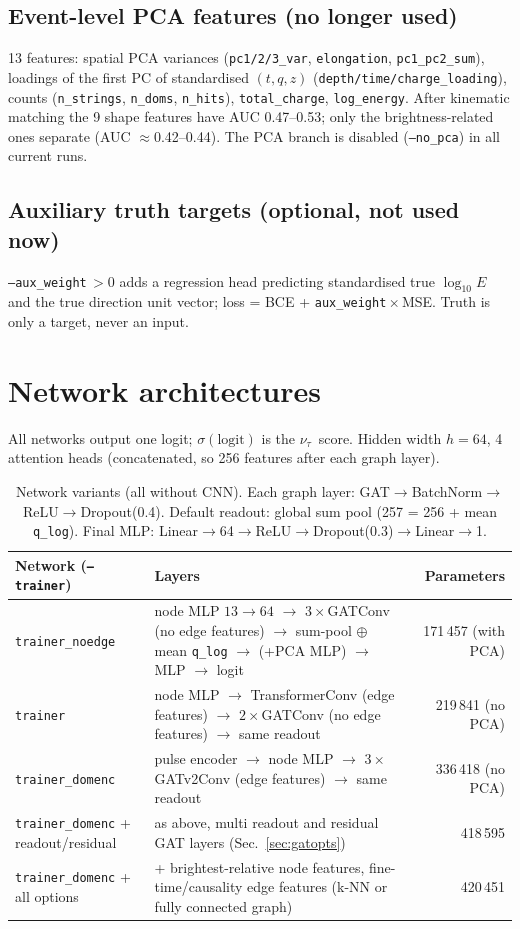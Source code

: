 \documentclass[11pt,a4paper]{article}
\newcommand{\nutau}{\ensuremath{\nu_\tau}}
\newcommand{\code}[1]{\texttt{#1}}
\begin{document}
\subsection{Event-level PCA features (no longer used)}
13 features: spatial PCA variances (\code{pc1/2/3\_var}, \code{elongation}, \code{pc1\_pc2\_sum}), loadings of the
first PC of standardised $(t,q,z)$ (\code{depth/time/charge\_loading}), counts (\code{n\_strings}, \code{n\_doms},
\code{n\_hits}), \code{total\_charge}, \code{log\_energy}. After kinematic matching the 9 shape features have
AUC 0.47--0.53; only the brightness-related ones separate (AUC $\approx$0.42--0.44). The PCA branch is disabled
(\code{--no\_pca}) in all current runs.

\subsection{Auxiliary truth targets (optional, not used now)}
\code{--aux\_weight}\,$>0$ adds a regression head predicting standardised true $\log_{10}E$ and the true direction unit
vector; loss = BCE + \code{aux\_weight}\,$\times$\,MSE. Truth is only a target, never an input.

\section{Network architectures}
All networks output one logit; $\sigma(\text{logit})$ is the \nutau\ score. Hidden width $h=64$, 4 attention heads
(concatenated, so 256 features after each graph layer).

\begin{table}[h]
\centering\small
\begin{tabularx}{\textwidth}{lYr}
\toprule
Network (\code{--trainer}) & Layers & Parameters\\
\midrule
\code{trainer\_noedge} & node MLP $13\to64$ $\to$ $3\times$GATConv (no edge features) $\to$ sum-pool $\oplus$ mean \code{q\_log} $\to$ (+PCA MLP) $\to$ MLP $\to$ logit & 171\,457 (with PCA)\\
\code{trainer} & node MLP $\to$ TransformerConv (edge features) $\to$ $2\times$GATConv (no edge features) $\to$ same readout & 219\,841 (no PCA)\\
\code{trainer\_domenc} & pulse encoder $\to$ node MLP $\to$ $3\times$GATv2Conv (edge features) $\to$ same readout & 336\,418 (no PCA)\\
\code{trainer\_domenc} + readout/residual & as above, multi readout and residual GAT layers (Sec.~\ref{sec:gatopts}) & 418\,595\\
\code{trainer\_domenc} + all options & + brightest-relative node features, fine-time/causality edge features (k-NN or fully connected graph) & 420\,451\\
\bottomrule
\end{tabularx}
\caption{Network variants (all without CNN). Each graph layer: GAT$\to$BatchNorm$\to$ReLU$\to$Dropout(0.4). Default
readout: global sum pool (257 = 256 + mean \code{q\_log}). Final MLP: Linear$\to$64$\to$ReLU$\to$Dropout(0.3)$\to$Linear$\to$1.}
\end{table}
\end{document}
